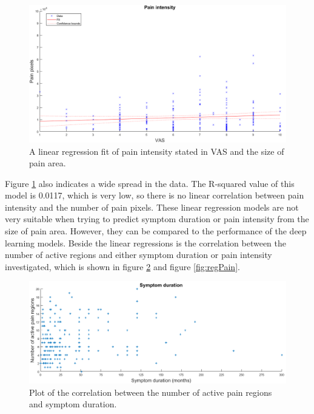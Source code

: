 \begin{figure} [H]
\centering
\includegraphics[width=1\textwidth]{figures/painRegression}
\caption{A linear regression fit of pain intensity stated in VAS and the size of pain area.}
\label{fig:painRegression}
\end{figure}

\noindent
Figure \ref{fig:painRegression} also indicates a wide spread in the data. The R-squared value of this model is 0.0117, which is very low, so there is no linear correlation between pain intensity and the number of pain pixels.
These linear regression models are not very suitable when trying to predict symptom duration or pain intensity from the size of pain area. However, they can be compared to the performance of the deep learning models. 
\noindent
Beside the linear regressions is the correlation between the number of active regions and either symptom duration or pain intensity investigated, which is shown in figure \ref{fig:regDuration} and figure \ref{fig:regPain}. \newline

\begin{figure} [H]
\centering
\includegraphics[width=1\textwidth]{figures/regionRegressionDuration}
\caption{Plot of the correlation between the number of active pain regions and symptom duration.}
\label{fig:regDuration}
\end{figure}

